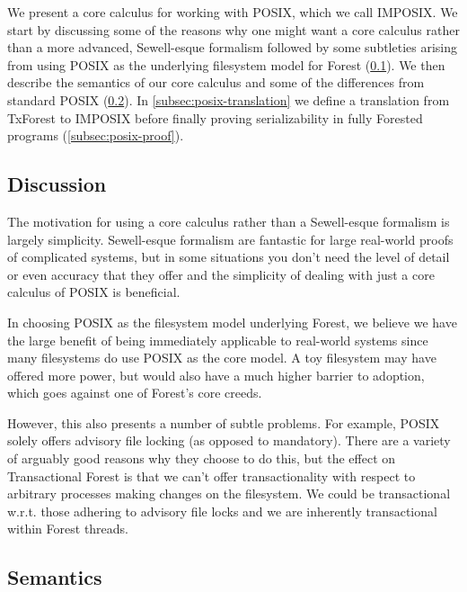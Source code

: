 We present a core calculus for working with POSIX, which we call IMPOSIX.
We start by discussing some of the reasons why one might want a core calculus
rather than a more advanced, Sewell-esque formalism followed by some
subtleties arising from using POSIX as the underlying filesystem model for 
Forest (\ref{subsec:posix-discussion}).
We then describe the semantics of our core calculus and some of the differences
from standard POSIX (\ref{subsec:posix-semantics}).
In \ref{subsec:posix-translation} we define a translation from TxForest to IMPOSIX 
before finally proving serializability in fully Forested programs (\ref{subsec:posix-proof}).

\subsection{Discussion}
\label{subsec:posix-discussion}

The motivation for using a core calculus rather than a Sewell-esque formalism
is largely simplicity. Sewell-esque formalism are fantastic for large
real-world proofs of complicated systems, but in some situations you don't
need the level of detail or even accuracy that they offer and the simplicity
of dealing with just a core calculus of POSIX is beneficial.

In choosing POSIX as the filesystem model underlying Forest, we
believe we have the large benefit of being immediately applicable to
real-world systems since many filesystems do use POSIX as the core
model. A toy filesystem may have offered more power, but would also have a much
higher barrier to adoption, which goes against one of Forest's core creeds.

However, this also presents a number of subtle problems. For example,
POSIX solely offers advisory file locking (as opposed to mandatory).
There are a variety of arguably good reasons why they choose to do this,
but the effect on Transactional Forest is that we can't offer
transactionality with respect to arbitrary processes making changes on the
filesystem. We could be transactional w.r.t. those adhering to advisory
file locks and we are inherently transactional within Forest threads.

\subsection{Semantics}
\label{subsec:posix-semantics}

